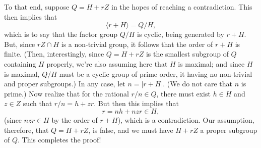 \documentclass[12pt]{article}
\begin{document}
To that end, suppose $Q=H+rZ$ in the hopes of reaching a contradiction.  This then implies that
\begin{equation*}
\langle r+H\rangle = Q/H,
\end{equation*}
which is to say that the factor group $Q/H$ is cyclic, being generated by $r+H$.
But, since $rZ\cap H$ is a non-trivial group, it follows that the order of $r+H$
is finite.  (Then, interestingly, since $Q=H+rZ$ is the smallest subgroup of $Q$
containing $H$ properly, we're also assuming here that $H$ is maximal; and since $H$
is maximal, $Q/H$ must be a cyclic group of prime order, it having no non-trivial
and proper subgroups.)  In any case, let $n=|r+H|$.  (We do not care that $n$ is prime.)
Now realize that for the rational $r/n\in Q$, there must exist $h\in H$ and $z\in Z$
such that $r/n=h+zr$.  But then this implies that
\begin{equation*}
r = nh + nzr\in H,
\end{equation*}
(since $nzr\in H$ by the order of $r+H$), which is a contradiction.
Our assumption, therefore, that $Q=H+rZ$, is false, and we must have
$H+rZ$ a proper subgroup of $Q$.  This completes the proof!
\end{document}
